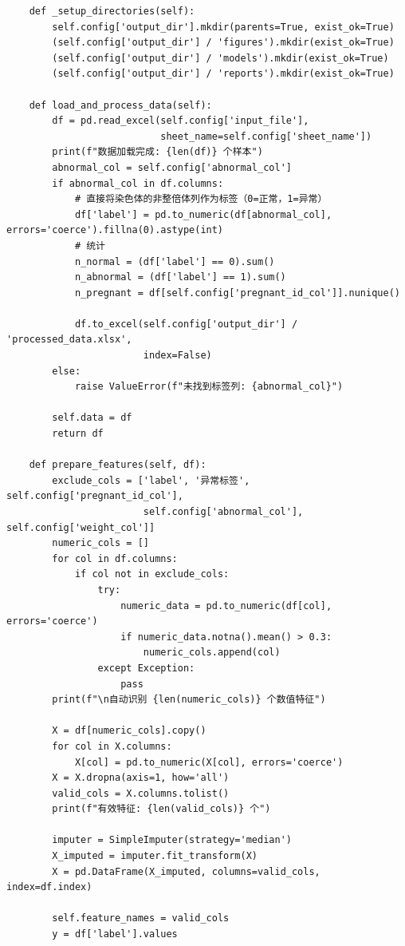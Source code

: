 \begin{lstlisting}
    def _setup_directories(self):
        self.config['output_dir'].mkdir(parents=True, exist_ok=True)
        (self.config['output_dir'] / 'figures').mkdir(exist_ok=True)
        (self.config['output_dir'] / 'models').mkdir(exist_ok=True)
        (self.config['output_dir'] / 'reports').mkdir(exist_ok=True)

    def load_and_process_data(self):
        df = pd.read_excel(self.config['input_file'],
                           sheet_name=self.config['sheet_name'])
        print(f"数据加载完成: {len(df)} 个样本")
        abnormal_col = self.config['abnormal_col']
        if abnormal_col in df.columns:
            # 直接将染色体的非整倍体列作为标签（0=正常，1=异常）
            df['label'] = pd.to_numeric(df[abnormal_col], errors='coerce').fillna(0).astype(int)
            # 统计
            n_normal = (df['label'] == 0).sum()
            n_abnormal = (df['label'] == 1).sum()
            n_pregnant = df[self.config['pregnant_id_col']].nunique()

            df.to_excel(self.config['output_dir'] / 'processed_data.xlsx',
                        index=False)
        else:
            raise ValueError(f"未找到标签列: {abnormal_col}")

        self.data = df
        return df

    def prepare_features(self, df):
        exclude_cols = ['label', '异常标签', self.config['pregnant_id_col'],
                        self.config['abnormal_col'], self.config['weight_col']]
        numeric_cols = []
        for col in df.columns:
            if col not in exclude_cols:
                try:
                    numeric_data = pd.to_numeric(df[col], errors='coerce')
                    if numeric_data.notna().mean() > 0.3:
                        numeric_cols.append(col)
                except Exception:
                    pass
        print(f"\n自动识别 {len(numeric_cols)} 个数值特征")
        
        X = df[numeric_cols].copy()
        for col in X.columns:
            X[col] = pd.to_numeric(X[col], errors='coerce')
        X = X.dropna(axis=1, how='all')
        valid_cols = X.columns.tolist()
        print(f"有效特征: {len(valid_cols)} 个")

        imputer = SimpleImputer(strategy='median')
        X_imputed = imputer.fit_transform(X)
        X = pd.DataFrame(X_imputed, columns=valid_cols, index=df.index)

        self.feature_names = valid_cols
        y = df['label'].values


\end{lstlisting}

